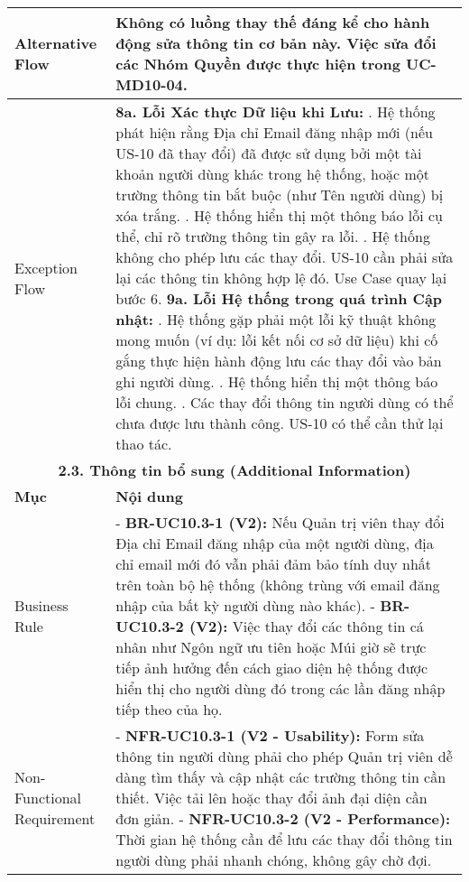 \begin{longtable}{|m{4cm}|p{11cm}|}
\hline
Alternative Flow & Không có luồng thay thế đáng kể cho hành động sửa thông tin cơ bản này. Việc sửa đổi các Nhóm Quyền được thực hiện trong UC-MD10-04. \\
\hline
Exception Flow & \textbf{8a. Lỗi Xác thực Dữ liệu khi Lưu:} \newline    1. Hệ thống phát hiện rằng Địa chỉ Email đăng nhập mới (nếu US-10 đã thay đổi) đã được sử dụng bởi một tài khoản người dùng khác trong hệ thống, hoặc một trường thông tin bắt buộc (như Tên người dùng) bị xóa trắng. \newline    2. Hệ thống hiển thị một thông báo lỗi cụ thể, chỉ rõ trường thông tin gây ra lỗi. \newline    3. Hệ thống không cho phép lưu các thay đổi. US-10 cần phải sửa lại các thông tin không hợp lệ đó. Use Case quay lại bước 6. \newline \textbf{9a. Lỗi Hệ thống trong quá trình Cập nhật:} \newline    1. Hệ thống gặp phải một lỗi kỹ thuật không mong muốn (ví dụ: lỗi kết nối cơ sở dữ liệu) khi cố gắng thực hiện hành động lưu các thay đổi vào bản ghi người dùng. \newline    2. Hệ thống hiển thị một thông báo lỗi chung. \newline    3. Các thay đổi thông tin người dùng có thể chưa được lưu thành công. US-10 có thể cần thử lại thao tác. \\
\hline
\multicolumn{2}{|c|}{\textbf{2.3. Thông tin bổ sung (Additional Information)}} \\
\hline
\textbf{Mục} & \textbf{Nội dung} \\
\hline
Business Rule & - \textbf{BR-UC10.3-1 (V2):} Nếu Quản trị viên thay đổi Địa chỉ Email đăng nhập của một người dùng, địa chỉ email mới đó vẫn phải đảm bảo tính duy nhất trên toàn bộ hệ thống (không trùng với email đăng nhập của bất kỳ người dùng nào khác). \newline - \textbf{BR-UC10.3-2 (V2):} Việc thay đổi các thông tin cá nhân như Ngôn ngữ ưu tiên hoặc Múi giờ sẽ trực tiếp ảnh hưởng đến cách giao diện hệ thống được hiển thị cho người dùng đó trong các lần đăng nhập tiếp theo của họ. \\
\hline
Non-Functional Requirement & - \textbf{NFR-UC10.3-1 (V2 - Usability):} Form sửa thông tin người dùng phải cho phép Quản trị viên dễ dàng tìm thấy và cập nhật các trường thông tin cần thiết. Việc tải lên hoặc thay đổi ảnh đại diện cần đơn giản. \newline - \textbf{NFR-UC10.3-2 (V2 - Performance):} Thời gian hệ thống cần để lưu các thay đổi thông tin người dùng phải nhanh chóng, không gây chờ đợi. \\
\hline
\end{longtable}

